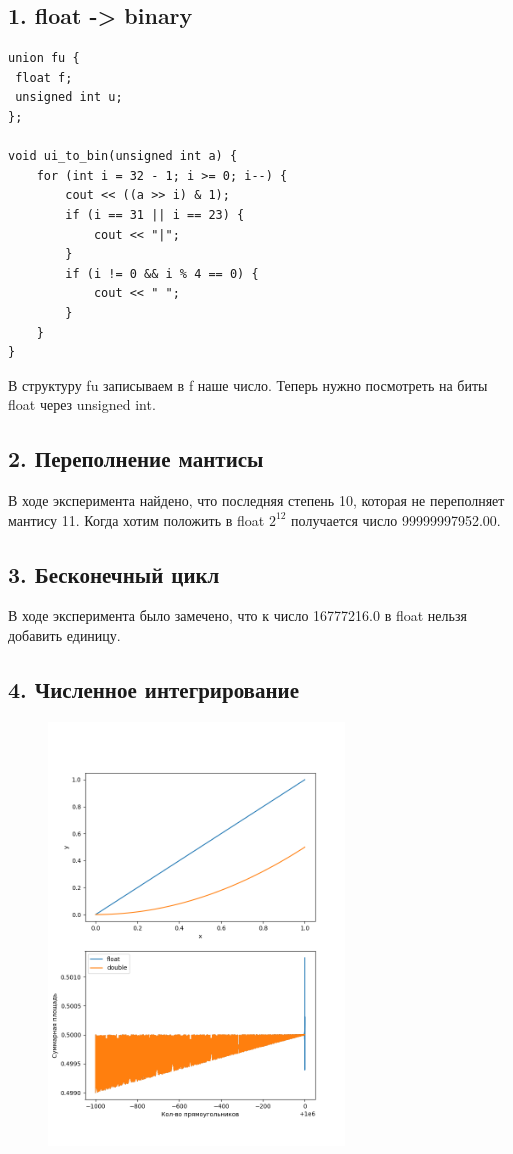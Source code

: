 \documentclass[a4paper, 12pt]{article}
\begin{document}
\subsection*{1. float -> binary}

\begin{lstlisting}
union fu {
 float f;
 unsigned int u;
};

void ui_to_bin(unsigned int a) {
    for (int i = 32 - 1; i >= 0; i--) {
        cout << ((a >> i) & 1);
        if (i == 31 || i == 23) {
            cout << "|";
        }
        if (i != 0 && i % 4 == 0) {
            cout << " ";
        }
    }
}
\end{lstlisting}

В структуру fu записываем в f наше число. Теперь нужно посмотреть на биты float через unsigned int.

\subsection*{2. Переполнение мантисы}

В ходе эксперимента найдено, что последняя степень 10, которая не переполняет мантису 11. Когда хотим положить в float $2^{12}$ получается число 99999997952.00.


\subsection*{3. Бесконечный цикл}

В ходе эксперимента было замечено, что к число 16777216.0 в float нельзя добавить единицу.

\newpage

\subsection*{4. Численное интегрирование}

\begin{figure}[h]
    \centering
    \includegraphics[width=0.7\textwidth]{4.png}
\end{figure}
\end{document}
